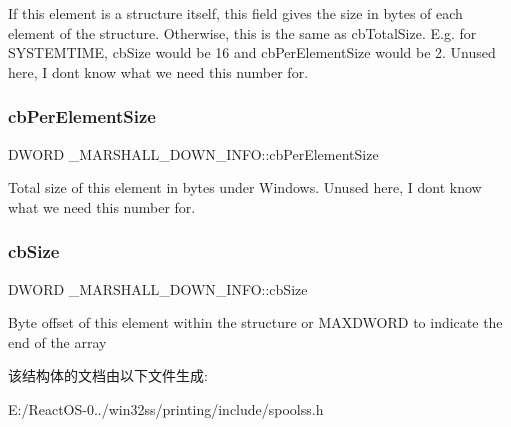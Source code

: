 If this element is a structure itself, this field gives the size in bytes of each element of the structure. Otherwise, this is the same as cb\+Total\+Size. E.\+g. for S\+Y\+S\+T\+E\+M\+T\+I\+ME, cb\+Size would be 16 and cb\+Per\+Element\+Size would be 2. Unused here, I don\textquotesingle{}t know what we need this number for. \mbox{\label{struct___m_a_r_s_h_a_l_l___d_o_w_n___i_n_f_o_a67d88eb2c721eae6ecf2cf2a64ba414d}} 
\subsubsection{\texorpdfstring{cb\+Per\+Element\+Size}{cbPerElementSize}}
{\footnotesize\ttfamily D\+W\+O\+RD \+\_\+\+M\+A\+R\+S\+H\+A\+L\+L\+\_\+\+D\+O\+W\+N\+\_\+\+I\+N\+F\+O\+::cb\+Per\+Element\+Size}

Total size of this element in bytes under Windows. Unused here, I don\textquotesingle{}t know what we need this number for. \mbox{\label{struct___m_a_r_s_h_a_l_l___d_o_w_n___i_n_f_o_a209465c4696e67dcf964ea76998695c0}} 
\subsubsection{\texorpdfstring{cb\+Size}{cbSize}}
{\footnotesize\ttfamily D\+W\+O\+RD \+\_\+\+M\+A\+R\+S\+H\+A\+L\+L\+\_\+\+D\+O\+W\+N\+\_\+\+I\+N\+F\+O\+::cb\+Size}

Byte offset of this element within the structure or M\+A\+X\+D\+W\+O\+RD to indicate the end of the array 

该结构体的文档由以下文件生成\+:\begin{DoxyCompactItemize}
\item 
E\+:/\+React\+O\+S-\/0../win32ss/printing/include/spoolss.\+h\end{DoxyCompactItemize}
